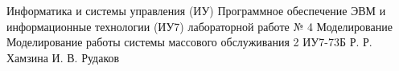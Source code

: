 \documentclass{bmstu}
\begin{document}
\makereporttitle
	{Информатика и системы управления (ИУ)}
	{Программное обеспечение ЭВМ и информационные технологии (ИУ7)}
	{лабораторной работе № 4}
	{Моделирование}
	{Моделирование работы системы массового обслуживания}
	{2}
	{ИУ7-73Б}
	{Р. Р. Хамзина}
	{И. В. Рудаков}

\maketableofcontents


\end{document}
